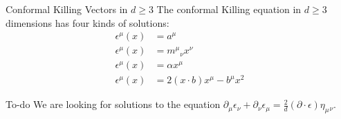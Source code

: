 
\begin{thm*}{Conformal Killing Vectors in $d \geq 3$}{} 
    The conformal Killing equation in $d\geq 3$ dimensions has four kinds of solutions:
    \begin{align*}
        \epsilon^\mu (x) &= a^\mu \\
        \epsilon^\mu (x) &= m^\mu{}_\nu x^\nu \\
        \epsilon^\mu (x) &= \alpha x^\mu \\
        \epsilon^\mu (x) &= 2(x\cdot b)x^\mu - b^\mu x^2
    \end{align*}
\end{thm*}

\begin{prf*}{}{}
    To-do
    We are looking for solutions to the equation $\partial_\mu \epsilon_\nu + \partial_\nu \epsilon_\mu = \frac{2}{d} (\partial \cdot \epsilon) \eta_\mu{}_\nu$.
\end{prf*}


